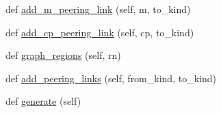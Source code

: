\begin{DoxyCompactItemize}
def \hyperlink{classnetworkx_1_1generators_1_1internet__as__graphs_1_1AS__graph__generator_a4591c3cbfa98ae51aab17bc88126b839}{add\+\_\+m\+\_\+peering\+\_\+link} (self, m, to\+\_\+kind)
\item 
def \hyperlink{classnetworkx_1_1generators_1_1internet__as__graphs_1_1AS__graph__generator_a7f0fd0b911e9035e89d416b25271e6b0}{add\+\_\+cp\+\_\+peering\+\_\+link} (self, cp, to\+\_\+kind)
\item 
def \hyperlink{classnetworkx_1_1generators_1_1internet__as__graphs_1_1AS__graph__generator_abbba507ad5095d4a488373a938cd7a91}{graph\+\_\+regions} (self, rn)
\item 
def \hyperlink{classnetworkx_1_1generators_1_1internet__as__graphs_1_1AS__graph__generator_a393a6f9c3d26b783df0260002975de7e}{add\+\_\+peering\+\_\+links} (self, from\+\_\+kind, to\+\_\+kind)
\item 
def \hyperlink{classnetworkx_1_1generators_1_1internet__as__graphs_1_1AS__graph__generator_afd3a91b998cd59fec28ea990c7cab2df}{generate} (self)
\end{DoxyCompactItemize}
